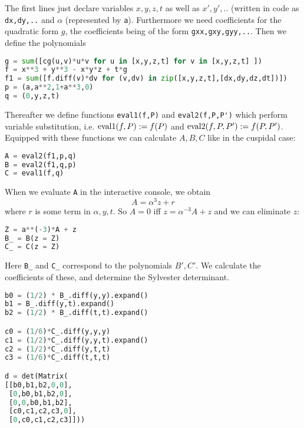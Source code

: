 The first lines just declare variables $x,y,z,t$ as well as $x',y',..$ (written in code as \verb|dx,dy,..| and $\alpha$ (represented by \verb|a|). Furthermore we need coefficients for the quadratic form $g$, the coefficients being of the form \verb|gxx,gxy,gyy,..|.
Then we define the polynomials
\begin{lstlisting}[frame=single,language=python]
g = sum([cg(u,v)*u*v for u in [x,y,z,t] for v in [x,y,z,t] ])
f = x**3 + y**3 - x*y*z + t*g
f1 = sum([f.diff(v)*dv for (v,dv) in zip([x,y,z,t],[dx,dy,dz,dt])])
p = (a,a**2,1+a**3,0)
q = (0,y,z,t)
\end{lstlisting}

Thereafter we define functions \verb|eval1(f,P)| and \verb|eval2(f,P,P')| which perform variable substitution, i.e. ${\operatorname{eval1}}(f,P) := f(P)$ and ${\operatorname{eval2}}(f,P,P') := f(P,P')$.
Equipped with these functions we can calculate $A,B,C$ like in the cuspidal case:

\begin{lstlisting}[frame=single,language=python]
A = eval2(f1,p,q)
B = eval2(f1,q,p)
C = eval1(f,q)
\end{lstlisting}

When we evaluate \verb|A| in the interactive console, we obtain
\begin{equation}
A = \alpha^3 z + r
\end{equation}
where $r$ is some term in $\alpha, y,t$.
So $A = 0$ iff $z = \alpha^{-3}A + z$ and we can eliminate $z$:

\begin{lstlisting}[frame=single,language=python]
Z = a**(-3)*A + z
B_ = B(z = Z)
C_ = C(z = Z)
\end{lstlisting}

Here \verb|B_| and \verb|C_| correspond to the polynomials $B',C'$.
We calculate the coefficients of these, and determine the Sylvester determinant.


\begin{lstlisting}[frame=single,language=python]
b0 = (1/2) * B_.diff(y,y).expand()
b1 = B_.diff(y,t).expand()
b2 = (1/2) * B_.diff(t,t).expand()

c0 = (1/6)*C_.diff(y,y,y)
c1 = (1/2)*C_.diff(y,y,t).expand()
c2 = (1/2)*C_.diff(y,t,t)
c3 = (1/6)*C_.diff(t,t,t)

d = det(Matrix(
[[b0,b1,b2,0,0], 
 [0,b0,b1,b2,0], 
 [0,0,b0,b1,b2], 
 [c0,c1,c2,c3,0], 
 [0,c0,c1,c2,c3]]))
\end{lstlisting}

